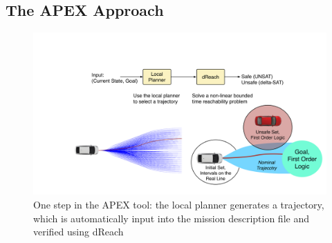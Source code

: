 \subsection{The APEX Approach}
\begin{figure}
	\includegraphics[width=\columnwidth]{figures/tool_single.png}
	\caption{One step in the APEX tool: the local planner generates a trajectory, which is automatically input into the mission description file and verified using dReach}
	\vspace{-10pt}
	\label{fig:apexsingle}
\end{figure}

